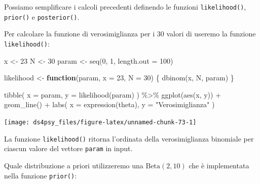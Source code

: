 \documentclass[
  11pt,
]{krantz}
\makeatletter
\newenvironment{Shaded}{\begin{snugshade}}{\end{snugshade}}
\newcommand{\AttributeTok}[1]{\textcolor[rgb]{0.61,0.61,0.61}{#1}}
\newcommand{\ControlFlowTok}[1]{\textcolor[rgb]{0.27,0.27,0.27}{\textbf{#1}}}
\newcommand{\DecValTok}[1]{\textcolor[rgb]{0.06,0.06,0.06}{#1}}
\newcommand{\FunctionTok}[1]{\textcolor[rgb]{0,0,0}{#1}}
\newcommand{\NormalTok}[1]{#1}
\newcommand{\OtherTok}[1]{\textcolor[rgb]{0.37,0.37,0.37}{#1}}
\newcommand{\SpecialCharTok}[1]{\textcolor[rgb]{0,0,0}{#1}}
\newcommand{\StringTok}[1]{\textcolor[rgb]{0.5,0.5,0.5}{#1}}
\newenvironment{kframe}{%
\medskip{}
\setlength{\fboxsep}{.8em}
 \def\at@end@of@kframe{}%
 \ifinner\ifhmode%
  \def\at@end@of@kframe{\end{minipage}}%
  \begin{minipage}{\columnwidth}%
 \fi\fi%
 \def\FrameCommand##1{\hskip\@totalleftmargin \hskip-\fboxsep
 \colorbox{shadecolor}{##1}\hskip-\fboxsep
     \hskip-\linewidth \hskip-\@totalleftmargin \hskip\columnwidth}%
 \MakeFramed {\advance\hsize-\width
   \@totalleftmargin\z@ \linewidth\hsize
   \@setminipage}}%
 {\par\unskip\endMakeFramed%
 \at@end@of@kframe}
\renewenvironment{Shaded}{\begin{kframe}}{\end{kframe}}
\theoremstyle{definition}
\theoremstyle{definition}
\theoremstyle{definition}
\theoremstyle{definition}
\theoremstyle{remark}
\makeatother
\begin{document}
Possiamo semplificare i calcoli precedenti definendo le funzioni \texttt{likelihood()}, \texttt{prior()} e \texttt{posterior()}.

Per calcolare la funzione di verosimiglianza per i 30 valori di \citet{zetschefuture2019} useremo la funzione \texttt{likelihood()}:

\begin{Shaded}
\begin{Highlighting}[]
\NormalTok{x }\OtherTok{\textless{}{-}} \DecValTok{23}
\NormalTok{N }\OtherTok{\textless{}{-}} \DecValTok{30}
\NormalTok{param }\OtherTok{\textless{}{-}} \FunctionTok{seq}\NormalTok{(}\DecValTok{0}\NormalTok{, }\DecValTok{1}\NormalTok{, }\AttributeTok{length.out =} \DecValTok{100}\NormalTok{)}

\NormalTok{likelihood }\OtherTok{\textless{}{-}} \ControlFlowTok{function}\NormalTok{(param, }\AttributeTok{x =} \DecValTok{23}\NormalTok{, }\AttributeTok{N =} \DecValTok{30}\NormalTok{) \{}
  \FunctionTok{dbinom}\NormalTok{(x, N, param)}
\NormalTok{\}}

\FunctionTok{tibble}\NormalTok{(}
  \AttributeTok{x =}\NormalTok{ param, }
  \AttributeTok{y =} \FunctionTok{likelihood}\NormalTok{(param)}
\NormalTok{) }\SpecialCharTok{\%\textgreater{}\%}
  \FunctionTok{ggplot}\NormalTok{(}\FunctionTok{aes}\NormalTok{(x, y)) }\SpecialCharTok{+}
  \FunctionTok{geom\_line}\NormalTok{() }\SpecialCharTok{+}
  \FunctionTok{labs}\NormalTok{(}
    \AttributeTok{x =} \FunctionTok{expression}\NormalTok{(theta),}
    \AttributeTok{y =} \StringTok{"Verosimiglianza"}
\NormalTok{  )}
\end{Highlighting}
\end{Shaded}

\begin{center}\texttt{[image: ds4psy\_files/figure-latex/unnamed-chunk-73-1]} \end{center}

La funzione \texttt{likelihood()} ritorna l'ordinata della verosimiglianza binomiale per ciascun valore del vettore \texttt{param} in input.

Quale distribuzione a priori utilizzeremo una \(\mbox{Beta}(2, 10)\) che è implementata nella funzione \texttt{prior()}:
\end{document}
